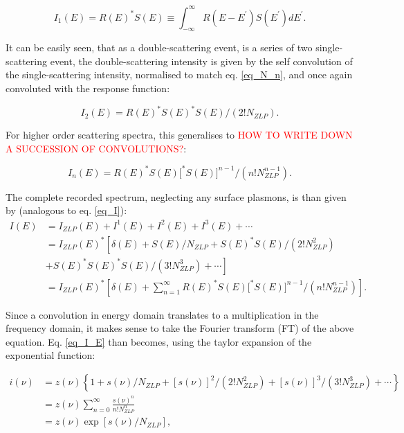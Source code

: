 \begin{equation}
    I_{1}(E)=R(E)^{*} S(E) \equiv \int_{-\infty}^{\infty} R\left(E-E^{\prime}\right) S\left(E^{\prime}\right) d E^{\prime}.
\end{equation}


It can be easily seen, that as a double-scattering event, is a series of two single-scattering event, the double-scattering intensity is given by the self convolution of the single-scattering intensity, normalised to match eq. \eqref{eq_N_n}, and once again convoluted with the response function:

\begin{equation}
    I_{2}(E)=R(E)^{*} S(E)^{*} S(E) /\left(2 ! N_{ZLP}\right).
\end{equation}

For higher order scattering spectra, this generalises to \textcolor{red}{HOW TO WRITE DOWN A SUCCESSION OF CONVOLUTIONS?}:


\begin{equation}
    I_{n}(E)=R(E)^{*} S(E)\big[^{*} S(E)\big]^{n-1} /\left(n ! N_{ZLP}^{n-1}\right).
\end{equation}

The complete recorded spectrum, neglecting any surface plasmons, is than given by (analogous to eq. \eqref{eq_I}):
\begin{equation} \label{eq_I_E}
    \begin{aligned}
        I(E) &=I_{ZLP}(E)+I^{1}(E)+I^{2}(E)+I^{3}(E)+\cdots \\
        &=I_{ZLP}(E)^{*}\left[\delta(E)+S(E) / N_{ZLP}+S(E)^{*} S(E) /\left(2 ! N_{ZLP}^{2}\right)\right.\\
        &\left.+S(E)^{*} S(E)^{*} S(E) /\left(3 ! N_{ZLP}^{3}\right)+\cdots\right]\\
        &= I_{ZLP}(E)^{*}\left[\delta(E)+ \sum_{n=1}^\infty R(E)^{*} S(E)\big[^{*} S(E)\big]^{n-1} /\left(n ! N_{ZLP}^{n-1}\right) \right].
        \end{aligned}
\end{equation}

Since a convolution in energy domain translates to a multiplication in the frequency domain, it makes sense to take the Fourier transform (FT) of the above equation. Eq. \eqref{eq_I_E} than becomes, using the taylor expansion of the exponential function:

\begin{equation}\label{eq_i_nu_exp}
    \begin{aligned}
i(\nu) &=z(\nu)\left\{1+s(\nu) / N_{ZLP}+[s(\nu)]^{2} /\left(2 ! N_{ZLP}^{2}\right)+[s(\nu)]^{3} /\left(3 ! N_{ZLP}^{3}\right)+\cdots\right\} \\
&=z(\nu)\sum_{n=0}^\infty\frac{s(\nu)^n}{n! N_{ZLP}^n}\\
&=z(\nu) \exp \left[s(\nu) / N_{ZLP}\right],
\end{aligned}
\end{equation}

